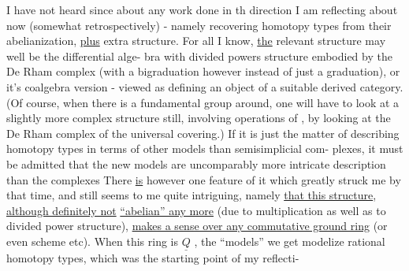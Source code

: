I have not heard since about any work done in th direction I
am reflecting about now (somewhat retrospectively)  -  namely recovering
homotopy types from their abelianization,  \uline{plus} extra structure.  For
all I know,  \uline{the}  relevant structure may well be the differential alge-%
bra  with divided powers  structure embodied by the De Rham
complex (with a bigraduation however instead of just a graduation),  or
it's coalgebra version  -  viewed as defining an object of a suitable
derived category.  (Of course,  when there is a fundamental group \hand{$\pi$}
around,  one will have to look at a slightly more complex structure
still,  involving operations of \hand{$\pi$},  by looking at the De Rham complex
of the universal covering.)   If it is just the matter of describing
homotopy types in terms of  other models than semisimplicial com-%
plexes,  it must be admitted that the new models are  uncomparably more
intricate description than the complexes  There \uline{is} however one feature
of it which greatly struck me by that time,  and still seems to me quite
intriguing,  namely \uline{that this structure},  \uline{although definitely not}
\uline{``abelian'' any more}  (due to multiplication as well as to divided power
structure),  \uline{makes a sense over any commutative ground ring} (or even
scheme etc).  When this ring is $\underline{Q}$ ,  the ``models'' we get modelize
rational homotopy types,  which was the starting point of my reflecti-%

